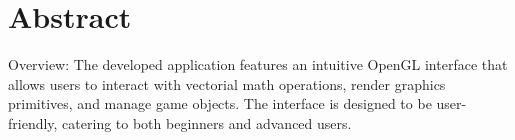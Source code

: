 \part*{Abstract} 

Overview: The developed application features an intuitive OpenGL interface that
allows users to interact with vectorial math operations, render graphics
primitives, and manage game objects. The interface is designed to be
user-friendly, catering to both beginners and advanced users.




